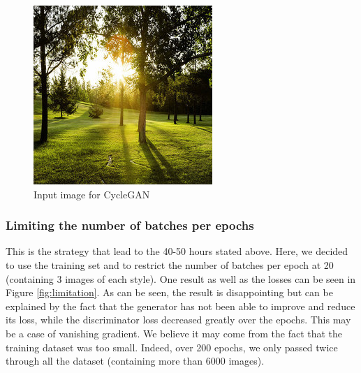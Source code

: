 \documentclass[twocolumn,superscriptaddress,aps,floatfix,nofootinbib]{revtex4-1}
\begin{document}
    \begin{figure}[H]
        \centering
        \includegraphics[scale=0.5]{resources/png/inputs/test.jpg}
        \caption{Input image for CycleGAN}
        \label{fig:landscape}
    \end{figure}
    
    \subsubsection{Limiting the number of batches per epochs}\label{limiting}
    
    This is the strategy that lead to the 40-50 hours stated above. Here, we decided to use the training set and to restrict the number of batches per epoch at 20 (containing 3 images of each style). One result as well as the losses can be seen in Figure \ref{fig:limitation}. As can be seen, the result is disappointing but can be explained by the fact that the generator has not been able to improve and reduce its loss, while the discriminator loss decreased greatly over the epochs. This may be a case of vanishing gradient. We believe it may come from the fact that the training dataset was too small. Indeed, over 200 epochs, we only passed twice through all the dataset (containing more than 6000 images).
    
\end{document}
